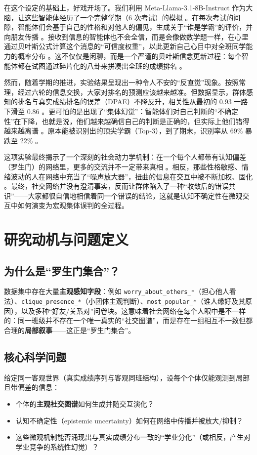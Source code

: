 \documentclass[UTF8, a4paper, 11pt]{ctexart}
\begin{document}
在这个设定的基础上，好戏开场了。我们利用 Meta-Llama-3.1-8B-Instruct 作为大脑，让这些智能体经历了一个完整学期（6 次考试）的模拟 。在每次考试的间隙，智能体们会基于自己的性格和对他人的偏见，生成关于“谁是学霸”的评价，并向朋友传播 。接收到信息的智能体也不会全信，而是会像做数学题一样，在心里通过贝叶斯公式计算这个消息的“可信度权重”，以此更新自己心目中对全班同学能力的概率分布 。这不仅仅是闲聊，而是一个严谨的贝叶斯信念更新过程：每个智能体都在试图通过碎片化的八卦来拼凑出全班的成绩排名 。

然而，随着学期的推进，实验结果呈现出一种令人不安的“反直觉”现象。按照常理，经过六轮的信息交换，大家对排名的预测应该越来越准。但数据显示，群体感知的排名与真实成绩排名的误差（DPAE）不降反升，相关性从最初的 0.93 一路下滑至 0.86 。更可怕的是出现了“集体幻觉”：智能体们对自己判断的“不确定性”在下降，也就是说，他们越来越确信自己的判断是正确的，但实际上他们错得越来越离谱 。原本能被识别出的顶尖学霸（Top-3），到了期末，识别率从 69\% 暴跌至 22\% 。

这项实验最终揭示了一个深刻的社会动力学机制：在一个每个人都带有认知偏差（罗生门）的网络里，更多的交流并不一定带来真相 。相反，那些性格敏感、情绪波动的人在网络中充当了“噪声放大器”，扭曲的信息在交互中被不断加权、固化 。最终，社交网络并没有澄清事实，反而让群体陷入了一种“收敛后的错误共识”——大家都很自信地相信着同一个错误的结论，这就是认知不确定性在微观交互中如何演变为宏观集体误判的全过程。

\section{研究动机与问题定义}
\subsection{为什么是“罗生门集合”？}
数据集中存在大量\textbf{主观感知字段}：例如 \texttt{worry\_about\_others\_*}（担心他人看法）、\texttt{clique\_presence\_*}（小团体主观判断）、\texttt{most\_popular\_*}（谁人缘好及其原因），以及多种“好友/关系对”问卷块。这意味着社会网络在每个人眼中是不一样的：同一班级并不存在一个唯一真实的“社交图谱”，而是存在一组相互不一致但都合理的\textbf{局部叙事}——这正是“罗生门集合”。

\subsection{核心科学问题}
给定同一客观世界（真实成绩序列与客观同班结构），设每个个体仅能观测到局部且带偏差的信息：
\begin{itemize}
    \item 个体的\textbf{主观社交图谱}如何生成并随交互演化？
    \item 认知不确定性（epistemic uncertainty）如何在网络中传播并被放大/抑制？
    \item 这些微观机制能否涌现出与真实成绩分布一致的“学业分化”（或相反，产生对学业竞争的系统性幻觉）？
\end{itemize}
\end{document}
